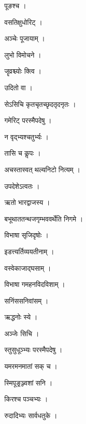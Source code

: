 \documentclass[10pt, openany]{book}
\begin{document}
\noindent पूङश्च ।

\noindent वसतिक्षुधोरिट् ।

\noindent अञ्चेः पूजायाम् ।

\noindent लुभो विमोचने ।

\noindent जॄव्रश्च्योः क्त्वि ।

\noindent उदितो वा ।

\noindent सेऽसिचि कृतचृतच्छृदतृदनृतः ।

\noindent गमेरिट् परस्मैपदेषु ।

\noindent न वृद्भ्यश्चतुर्भ्यः ।

\noindent तासि च कॢपः ।

\noindent अचस्तास्वत् थल्यनिटो नित्यम् ।

\noindent उपदेशेऽत्वतः ।

\noindent ऋतो भारद्वाजस्य ।

\noindent बभूथाततन्थजगृम्भववर्थेति निगमे ।

\noindent विभाषा सृजिदृषोः ।

\noindent इडत्त्यर्तिव्ययतीनाम् ।

\noindent वस्वेकाजाद्घसाम् ।

\noindent विभाषा गमहनविदविशाम् ।

\noindent सनिंससनिवांसम् ।

\noindent ऋद्धनोः स्ये ।

\noindent अञ्जेः सिचि ।

\noindent स्तुसुधूञ्भ्यः परस्मैपदेषु ।

\noindent यमरमनमातां सक् च ।

\noindent स्मिपूङ्रञ्ज्वशां सनि ।

\noindent किरश्च पञ्चभ्यः ।

\noindent रुदादिभ्यः सार्वधतुके ।
\end{document}
